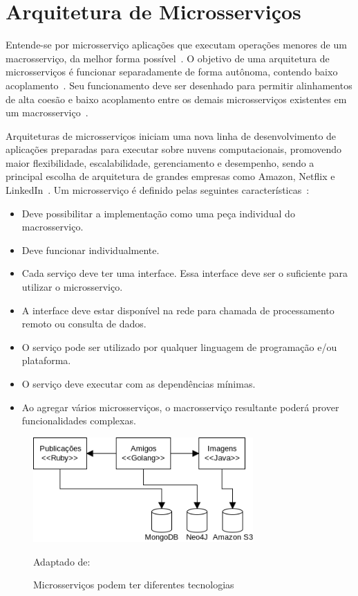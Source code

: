 \section{Arquitetura de Microsserviços}
\label{sec:microsservicos}



Entende-se por microsserviço aplicações que executam operações menores de um macrosserviço, da melhor forma possível~\cite{stephenclarkewillson2017, Newman2015Feb}.
%
O objetivo de uma arquitetura de microsserviços é funcionar separadamente de forma autônoma, contendo baixo acoplamento~\cite{Newman2015Feb}.
%
Seu funcionamento deve ser desenhado para permitir alinhamentos de alta coesão e baixo acoplamento entre os demais microsserviços existentes em um macrosserviço~\cite{8169955}.



Arquiteturas de microsserviços iniciam uma nova linha de desenvolvimento de aplicações preparadas para executar sobre nuvens computacionais, promovendo maior flexibilidade, escalabilidade, gerenciamento e desempenho, sendo a principal escolha de arquitetura de grandes empresas como Amazon, Netflix e LinkedIn~\cite{7830692,7515686}.
%
Um microsserviço é definido pelas seguintes características~\cite{8169955}:



\begin{itemize}
  \item Deve possibilitar a implementação como uma peça individual do macrosserviço.
  \item Deve funcionar individualmente.
  \item Cada serviço deve ter uma interface. Essa interface deve ser o suficiente para utilizar o microsserviço.
  \item A interface deve estar disponível na rede para chamada de processamento remoto ou consulta de dados.
  \item O serviço pode ser utilizado por qualquer linguagem de programação e/ou plataforma.
  \item O serviço deve executar com as dependências mínimas.
  \item Ao agregar vários microsserviços, o macrosserviço resultante poderá prover funcionalidades complexas.
\end{itemize}

\begin{figure}[htb!]
\caption{Microsserviços podem ter diferentes tecnologias}
\label{fig:microsservicos_tecnologias}
\includegraphics[height=4cm]{img/cap2/microsservicos_tecnologias.png}
\centering

Adaptado de:~\cite{Newman2015Feb}
\end{figure}


